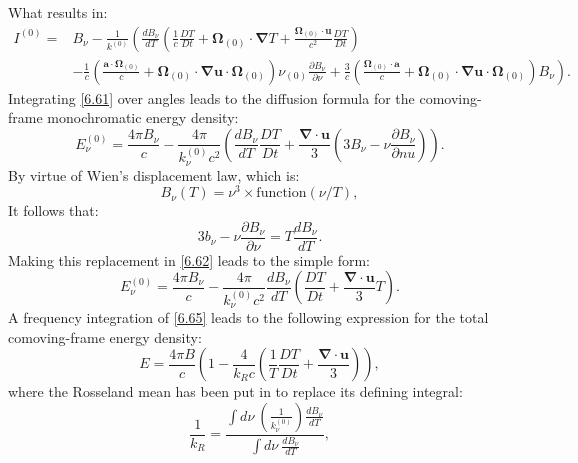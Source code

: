 \documentclass[letterpaper]{report}
\newcommand\bn{\boldsymbol{\nabla}}
\newcommand\bo{\boldsymbol{\Omega}}
\newcommand\bu{\mathbf{u}}
\newcommand\bs{\boldsymbol}
\renewcommand{\(}{\left(}
\renewcommand{\)}{\right)}
\renewcommand{\[}{\left[}
\renewcommand{\]}{\right]}
\begin{document}
What results in:
\begin{equation}
  \begin{split}
    I^{(0)} =&B_{\nu}-\frac{1}{k^{(0)}} \(\frac{dB_{\nu}}{dT}
    \(\frac{1}{c}\frac{DT}{Dt}+\bo_{(0)}\cdot \bn T +
    \frac{\bo_{(0)}\cdot\bu}{c^2}\frac{DT}{Dt}\)\right.\\
    &\left.-\frac{1}{c}\(\frac{\bs{a}\cdot\bo_{(0)}}{c}+\bo_{(0)}\cdot\bn\bu
    \cdot \bo_{(0)}\) \nu_{(0)}\frac{\partial B_{\nu}}{\partial \nu} +
    \frac{3}{c}\(\frac{\bo_{(0)}\cdot\bs{a}}{c} + \bo_{(0)}\cdot\bn\bu\cdot
    \bo_{(0)}\)B_{\nu}\).
    \label{6.61}
  \end{split}
\end{equation}
Integrating \cref{6.61} over angles leads to the diffusion formula for the
comoving-frame monochromatic energy density:
\begin{equation}
  E_{\nu}^{(0)} = \frac{4\pi B_{\nu}}{c} - \frac{4\pi}{k_{\nu}^{(0)} c^2}
  \(\frac{dB_{\nu}}{dT}\frac{DT}{Dt}+ \frac{\bn\cdot \bu}{3}
  \(3B_{\nu}-\nu\frac{\partial B_{\nu}}{\partial nu}\)\).
  \label{6.62}
\end{equation}
By virtue of Wien's displacement law, which is:
\begin{equation}
  B_{\nu}(T) = \nu^3 \times\textrm{function}(\nu/T),
  \label{6.63}
\end{equation}
It follows that:
\begin{equation}
  3 b_{\nu} -\nu\frac{\partial B_{\nu}}{\partial \nu}=T\frac{dB_{\nu}}{dT}.
  \label{6.64}
\end{equation}
Making this replacement in \cref{6.62} leads to the simple form:
\begin{equation}
  E_{\nu}^{(0)} = \frac{4\pi B_{\nu}}{c} -
  \frac{4\pi}{k_{\nu}^{(0)}c^2}\frac{dB_{\nu}}{dT}
  \(\frac{DT}{Dt}+\frac{\bn\cdot\bu}{3} T\).
  \label{6.65}
\end{equation}
A frequency integration of \cref{6.65} leads to the following expression for
the total comoving-frame energy density:
\begin{equation}
  E = \frac{4\pi B}{c} \(1-\frac{4}{k_R c}\(\frac{1}{T}\frac{DT}{Dt} +
  \frac{\bn\cdot\bu}{3}\)\),
  \label{6.66}
\end{equation}
where the Rosseland mean has been put in to replace its defining integral:
\begin{equation}
  \frac{1}{k_R} = \frac{\int d\nu\ \(\frac{1}{k_{\nu}^{(0)}}\)
  \frac{dB_{\nu}}{dT}}{\int d\nu\ \frac{dB_{\nu}}{dT}},
  \label{6.67}
\end{equation}
\end{document}
